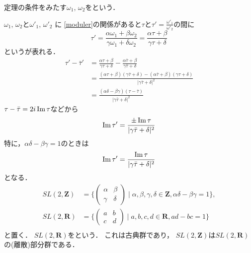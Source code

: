 定理の条件をみたす$\omega_1$, $\omega_2$をという．

$\omega_1$, $\omega_2$と$\omega'_1$, $\omega'_2$ に
\eqref{moduler}の関係があると$\tau$と$\tau'=\frac{\omega'_1}{\omega'_2}$の間に
\begin{equation}
	\tau'
	=\frac{\alpha\omega_1+\beta\omega_2}
		{\gamma\omega_1+\delta\omega_2}
	=\frac{\alpha\tau+\beta}
		{\gamma\tau+\delta}
\end{equation}
というが表れる．
\[
\begin{split}
	\tau'-\bar\tau'
	&=
	\frac{\alpha\tau+\beta}{\gamma\tau+\delta}
	-
	\frac{\alpha\bar\tau+\beta}{\gamma\bar\tau+\delta}\\
	&=
	\frac{(\alpha\tau+\beta)(\gamma\bar\tau+\delta)-
	(\alpha\bar\tau+\beta)(\gamma\tau+\delta)}{|\gamma\bar\tau+\delta|^2}\\
	&=\frac{(\alpha\delta -\beta\gamma)(\tau-\bar\tau)}{|\gamma\bar\tau+\delta|^2}
\end{split}
\]
$\tau-\bar\tau=2i\operatorname{Im} \tau$などから
\[
	\operatorname{Im} \tau' =\frac{\pm \operatorname{Im}\tau}{|\gamma\bar\tau+\delta|^2}
\]
特に，$\alpha\delta -\beta\gamma=1$のときは
\begin{equation}\label{transformation}
	\operatorname{Im} \tau' =\frac{\operatorname{Im}\tau}{|\gamma\bar\tau+\delta|^2}
\end{equation}
となる．
\[
\begin{split}
	SL(2,\mathbf Z)
	&=
	\{
		\begin{pmatrix}
			\alpha&\beta\\
			\gamma&\delta
		\end{pmatrix}
		\mid
		\alpha, \beta,\gamma,\delta \in \mathbf Z,
		\alpha\delta -\beta\gamma=1
	\},\\
	SL(2,\mathbf R)
	&=
	\{
		\begin{pmatrix}
			a&b\\
			c&d
		\end{pmatrix}
		\mid
		a,b,c,d \in \mathbf R,
		ad-bc=1
	\}\\
\end{split}
\]
と置く．
$SL(2,\mathbf R)$をという．
これは古典群であり，
$SL(2,\mathbf Z)$は$SL(2,\mathbf R)$の(離散)部分群である．


